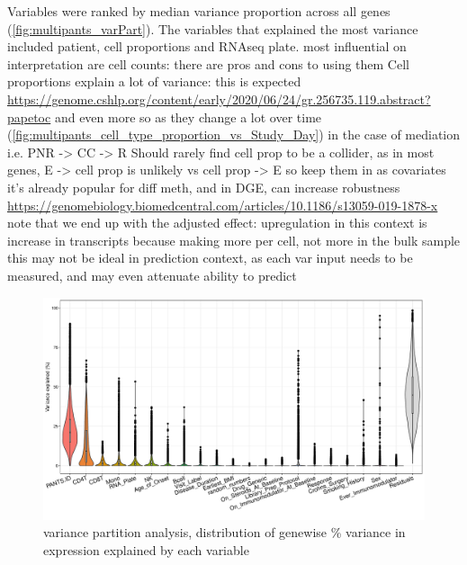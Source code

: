 \begin{outline}
\1 Variables were ranked by median variance proportion across all genes (\autoref{fig:multipants_varPart}).
The variables that explained the most variance included patient, cell proportions and \gls{RNAseq} plate.
    \2 most influential on interpretation are cell counts: there are pros and cons to using them
    \2 Cell proportions explain a lot of variance: this is expected \url{https://genome.cshlp.org/content/early/2020/06/24/gr.256735.119.abstract?papetoc} and even more so as they change a lot over time (\autoref{fig:multipants_cell_type_proportion_vs_Study_Day})
    \2 in the case of mediation i.e. PNR -> CC -> R
    \2 Should rarely find cell prop to be a collider, as in most genes, E -> cell prop is unlikely vs cell prop -> E
    \2 so keep them in as covariates
        \3 it's already popular for diff meth, and in DGE, can increase robustness \url{https://genomebiology.biomedcentral.com/articles/10.1186/s13059-019-1878-x}
    \2 note that we end up with the adjusted effect: upregulation in this context is increase in transcripts because making more per cell, not more in the bulk sample
        \3 this may not be ideal in prediction context, as each var input needs to be measured, and may even attenuate ability to predict \autocite{gaujoux2019CellcentredMetaanalysisReveals}

\begin{figure}
    \centering
    \includegraphics[width=1.0\textwidth,page=1]{mainmatter/figures/chapter_04/dream.plotVarPart.pdf}
    \caption{variance partition analysis, distribution of genewise \% variance in expression explained by each variable}
    \label{fig:multipants_varPart}
\end{figure}


\end{outline}
